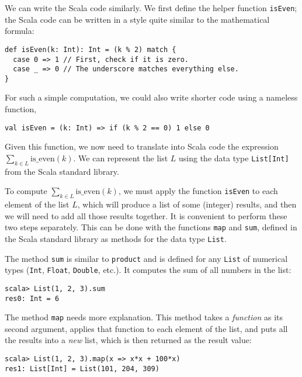 We can write the Scala code similarly. We first define the helper
function \lstinline!isEven!; the Scala code can be written in a style
quite similar to the mathematical formula:

\begin{lstlisting}
def isEven(k: Int): Int = (k % 2) match {
  case 0 => 1 // First, check if it is zero.
  case _ => 0 // The underscore matches everything else.
}
\end{lstlisting}

For such a simple computation, we could also write shorter code using
a nameless function,

\begin{lstlisting}
val isEven = (k: Int) => if (k % 2 == 0) 1 else 0
\end{lstlisting}

Given this function, we now need to translate into Scala code the
expression $\sum_{k\in L}\text{is\_even}\left(k\right)$. We can represent
the list $L$ using the data type \lstinline!List[Int]! from the
Scala standard library.

To compute $\sum_{k\in L}\text{is\_even}\left(k\right)$, we must
apply the function \texttt{}\lstinline!isEven! to each element of
the list $L$, which will produce a list of some (integer) results,
and then we will need to add all those results together. It is convenient
to perform these two steps separately. This can be done with the functions
\texttt{}\lstinline!map! and \lstinline!sum!, defined in the Scala
standard library as methods for the data type \lstinline!List!.

The method \texttt{}\lstinline!sum! is similar to \lstinline!product!
and is defined for any \lstinline!List! of numerical types (\lstinline!Int!,
\lstinline!Float!, \lstinline!Double!, etc.). It computes the sum
of all numbers in the list:
\begin{lstlisting}
scala> List(1, 2, 3).sum
res0: Int = 6
\end{lstlisting}

The method \texttt{}\lstinline!map! needs more explanation. This
method takes a \emph{function} as its second argument, applies that
function to each element of the list, and puts all the results into
a \emph{new }list, which is then returned as the result value:

\begin{lstlisting}
scala> List(1, 2, 3).map(x => x*x + 100*x)
res1: List[Int] = List(101, 204, 309)
\end{lstlisting}

